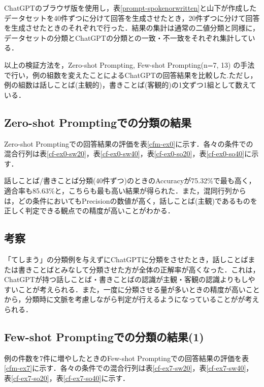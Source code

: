 ChatGPTのブラウザ版を使用し，表\ref{prompt-spokenorwritten}と山下が作成したデータセットを40件ずつに分けて回答を生成させたとき，20件ずつに分けて回答を生成させたときのそれぞれで行った．結果の集計は通常の二値分類と同様に，データセットの分類とChatGPTの分類との一致・不一致をそれぞれ集計している．

以上の検証方法を，Zero-shot Prompting, Few-shot Prompting(n=7, 13) の手法で行い，例の組数を変えたことによるChatGPTの回答結果を比較した.ただし，例の組数は話しことば(主観的)，書きことば(客観的)の1文ずつ1組として数えている．

\subsection{Zero-shot Promptingでの分類の結果 \label{c6s1-1}}
Zero-shot Promptingでの回答結果の評価を表\ref{cfm-ex0}に示す．各々の条件での混合行列は表\ref{cf-ex0-sw20}，表\ref{cf-ex0-sw40}，表\ref{cf-ex0-so20}，表\ref{cf-ex0-so40}に示す．







話しことば/書きことば分類(40件ずつ)のときのAccuracyが75.32\%で最も高く，適合率も85.63\%と，こちらも最も高い結果が得られた．また，混同行列からは，どの条件においてもPrecisionの数値が高く，話しことば(主観)であるものを正しく判定できる観点での精度が高いことがわかる．

\subsection{考察}
「てしまう」の分類例を与えずにChatGPTに分類をさせたとき，話しことばまたは書きことばとみなして分類させた方が全体の正解率が高くなった．これは，ChatGPTが持つ話しことば・書きことばの認識が主観・客観の認識よりもしやすいことが考えられる．また，一度に分類させる量が多いときの精度が高いことから，分類時に文脈を考慮しながら判定が行えるようになっていることがが考えられる．

\subsection{Few-shot Promptingでの分類の結果(1) \label{c6s1-2}}
例の件数を7件に増やしたときのFew-shot Promptingでの回答結果の評価を表\ref{cfm-ex7}に示す．各々の条件での混合行列は表\ref{cf-ex7-sw20}，表\ref{cf-ex7-sw40}，表\ref{cf-ex7-so20}，表\ref{cf-ex7-so40}に示す．







